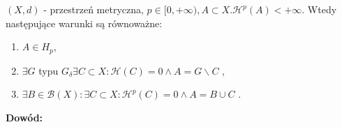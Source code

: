 \begin{tw}
	$(X,d)$ - przestrzeń metryczna, $p \in [0, +\infty), A \subset X. \mathcal{H}^p(A) < +\infty$. Wtedy następujące warunki są równoważne:
	\begin{enumerate}
		\item $A \in H_p$,
		\item $\exists G$ typu $G_{\delta} \exists C \subset X: \mathcal{H}(C)=0 \wedge A = G \backslash C$ ,
		\item $\exists B \in \mathcal{B}(X): \exists C \subset X: \mathcal{H}^p(C) = 0 \wedge A = B \cup C$ .
	\end{enumerate}

	\textbf{Dowód:} \citep[2.52]{Tworzewski}
\end{tw}